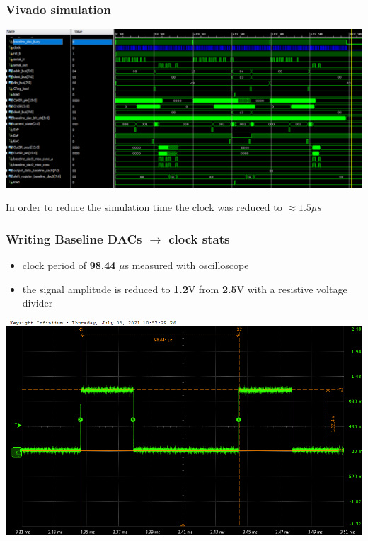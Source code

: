\documentclass[aspectratio=169]{beamer}
\begin{document}
	\begin{frame}
	\frametitle{Vivado simulation}
		\begin{center}
			\includegraphics[width=0.85 \textwidth]{IMG/TotalSimulation.png}
		\end{center}
	In order to reduce the simulation time the clock was reduced to $\approx1.5\mu s$
	\end{frame}

	\begin{frame}
	\frametitle{Writing Baseline DACs $\rightarrow$ clock stats}
	\begin{itemize}
		\item clock period of \textbf{98.44} $\mu$s measured with oscilloscope
		\item the signal amplitude is reduced to \textbf{1.2}V from \textbf{2.5}V with a resistive voltage divider 
	\end{itemize}
	\begin{center}
		\includegraphics[width=0.65 \textwidth]{IMG/probe/09-08-2021_clock-specks.png}
	\end{center}
	\end{frame}
\end{document}
